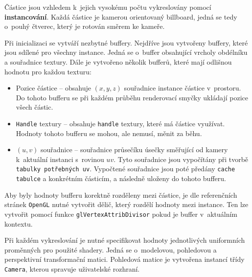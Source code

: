 Částice jsou vzhledem k~jejich vysokému počtu vykreslovány pomocí \textbf{instancování}. Každá částice je kamerou orientovaný billboard, jedná se tedy o~pouhý čtverec, který je rotován směrem ke kameře.  

Při inicializaci se vytváří nezbytné buffery. Nejdříve jsou vytvořeny buffery, které jsou sdílené pro všechny instance. Jedná se o~buffer obsahující vrcholy obdélníku a souřadnice textury. Dále je vytvořeno několik bufferů, které mají odlišnou  hodnotu pro každou texturu:
\begin{itemize}
    \item Pozice částice -- obsahuje $(x,y,z)$ souřadnice instance částice v~prostoru. Do tohoto bufferu se při každém průběhu renderovací smyčky ukládají pozice všech částic. 
    \item \texttt{Handle} textury -- obsahuje \texttt{handle} textury, které má částice využívat. Hodnoty tohoto bufferu se mohou, ale nemusí, měnit za běhu. 
    \item $(u,v)$ souřadnice -- souřadnice průsečíku úsečky směřující od kamery k~aktuální instanci s~rovinou $uv$. Tyto souřadnice jsou vypočítány při tvorbě \texttt{tabulky potřebných uv}. Vypočtené souřadnice jsou poté předány \texttt{cache tabulce} a konkrétním částicím, a následně uloženy do tohoto bufferu.
\end{itemize}
Aby byly hodnoty bufferu korektně rozděleny mezi částice, je dle referenčních stránek \texttt{OpenGL}\cite{glrefpages} nutné vytvořit dělič, který rozdělí hodnoty mezi instance. Ten lze vytvořit pomocí funkce \texttt{glVertexAttribDivisor} pokud je buffer v~aktuálním kontextu. 

Při každém vykreslování je nutné specifikovat hodnoty jednotlivých uniformních proměnných pro použité shadery. Jedná se o~modelovou, pohledovou a perspektivní transformační matici. Pohledová matice je vytvořena instancí třídy \texttt{Camera}, kterou spravuje uživatelské rozhraní.

